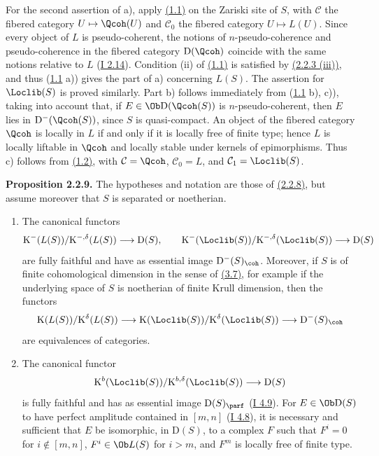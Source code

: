 For the second assertion of a), apply \hyperlink{sga6.e02.prop.1-1}{(1.1)} on the Zariski site of $S$, with $\mathcal C$ the fibered category $U\mapsto\Qcoh(U)$ and $\mathcal C_0$ the fibered category $U\mapsto L(U)$. Since every object of $L$ is pseudo-coherent, the notions of $n$-pseudo-coherence and pseudo-coherence in the fibered category $\mathrm D(\Qcoh)$ coincide with the same notions relative to $L$ (\hyperlink{sga6.e01.cor.2-14}{I 2.14}). Condition (ii) of \hyperlink{sga6.e02.prop.1-1}{(1.1)} is satisfied by \hyperlink{sga6.e02.prop.2-2-3}{(2.2.3 (iii))}, and thus (\hyperlink{sga6.e02.prop.1-1}{1.1} a)) gives the part of a) concerning $L(S)$. The assertion for $\Loclib(S)$ is proved similarly. Part b) follows immediately from (\hyperlink{sga6.e02.prop.1-1}{1.1} b), c)), taking into account that, if $E\in\Ob\mathrm D(\Qcoh(S))$ is $n$-pseudo-coherent, then $E$ lies in $\mathrm D^{-}(\Qcoh(S))$, since $S$ is quasi-compact. An object of the fibered category $\Qcoh$ is locally in $L$ if and only if it is locally free of finite type; hence $L$ is locally liftable in $\Qcoh$ and locally stable under kernels of epimorphisms. Thus c) follows from \hyperlink{sga6.e02.prop.1-2}{(1.2)}, with $\mathcal C=\Qcoh$, $\mathcal C_0=L$, and $\mathcal C_1=\Loclib(S)$.

\textbf{Proposition 2.2.9.} The hypotheses and notation are those of \hyperlink{sga6.e02.thm.2-2-8}{(2.2.8)}, but assume moreover that $S$ is separated or noetherian.
\begin{enumerate}[label=\alph*)]
\item The canonical functors
\[
\mathrm K^{-}(L(S))/\mathrm K^{-,\delta}(L(S))\longrightarrow \mathrm D(S),
\qquad
\mathrm K^{-}(\Loclib(S))/\mathrm K^{-,\delta}(\Loclib(S))\longrightarrow \mathrm D(S)
\]
are fully faithful and have as essential image $\mathrm D^{-}(S)_{\coh}$. Moreover, if $S$ is of finite cohomological dimension in the sense of \hyperlink{sga6.e02.prop.3-7}{(3.7)}, for example if the underlying space of $S$ is noetherian of finite Krull dimension, then the functors
\[
\mathrm K(L(S))/\mathrm K^{\delta}(L(S))\longrightarrow
\mathrm K(\Loclib(S))/\mathrm K^{\delta}(\Loclib(S))\longrightarrow
\mathrm D^{-}(S)_{\coh}
\]
are equivalences of categories.
\item The canonical functor
\[
\mathrm K^b(\Loclib(S))/\mathrm K^{b,\delta}(\Loclib(S))\longrightarrow \mathrm D(S)
\]
is fully faithful and has as essential image $\mathrm D(S)_{\parf}$ (\hyperlink{sga6.e01.notation.4-9}{I 4.9}). For $E\in\Ob\mathrm D(S)$ to have perfect amplitude contained in $[m,n]$ (\hyperlink{sga6.e01.ex.4-8}{I 4.8}), it is necessary and sufficient that $E$ be isomorphic, in $\mathrm D(S)$, to a complex $F$ such that $F^i=0$ for $i\notin[m,n]$, $F^i\in\Ob L(S)$ for $i>m$, and $F^m$ is locally free of finite type.
\end{enumerate}

